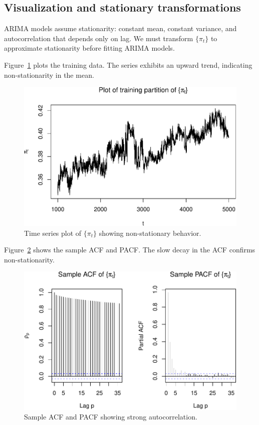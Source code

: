 \documentclass[final,11pt]{article}
\theoremstyle{plain}
\theoremstyle{remark}
\begin{document}
\hypertarget{visualization-and-stationary-transformations}{%
\subsection{Visualization and stationary
transformations}\label{visualization-and-stationary-transformations}}

ARIMA models assume stationarity: constant mean, constant variance, and
autocorrelation that depends only on lag. We must transform $\{\pi_t\}$ to
approximate stationarity before fitting ARIMA models.

Figure~\ref{fig:fa} plots the training data. The series exhibits an
upward trend, indicating non-stationarity in the mean.

\begin{figure}
\includegraphics{paper_files/figure-latex/unnamed-chunk-2-1.pdf}
\caption{Time series plot of $\{\pi_t\}$ showing non-stationary behavior.}
\label{fig:fa}
\end{figure}

Figure~\ref{fig:f0} shows the sample ACF and PACF. The slow decay in the
ACF confirms non-stationarity.

\begin{figure}
\includegraphics{paper_files/figure-latex/unnamed-chunk-3-1.pdf}
\caption{Sample ACF and PACF showing strong autocorrelation.}
\label{fig:f0}
\end{figure}
\end{document}
